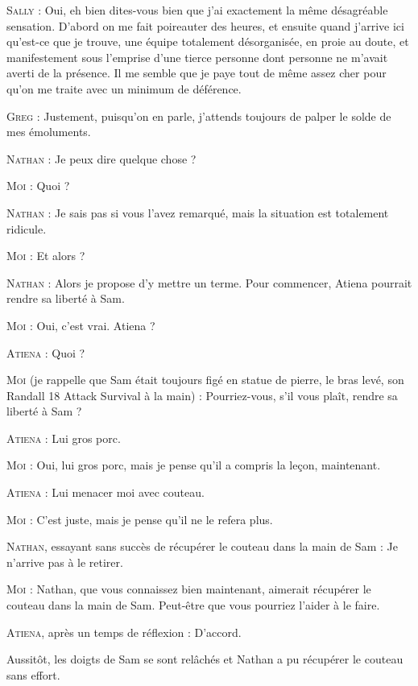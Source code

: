 \begin{dialogue}
\textsc{Sally} : Oui, eh bien dites-vous bien que j’ai exactement la même désagréable sensation. D’abord on me fait poireauter des heures, et ensuite quand j’arrive ici qu’est-ce que je trouve, une équipe totalement désorganisée, en proie au doute, et manifestement sous l’emprise d’une tierce personne dont personne ne m’avait averti de la présence. Il me semble que je paye tout de même assez cher pour qu’on me traite avec un minimum de déférence.

\textsc{Greg} : Justement, puisqu’on en parle, j’attends toujours de palper le solde de mes émoluments.

\textsc{Nathan} : Je peux dire quelque chose ?

\textsc{Moi} : Quoi ?

\textsc{Nathan} : Je sais pas si vous l’avez remarqué, mais la situation est totalement ridicule.

\textsc{Moi} : Et alors ?

\textsc{Nathan} : Alors je propose d’y mettre un terme. Pour commencer, Atiena pourrait rendre sa liberté à Sam.

\textsc{Moi} : Oui, c’est vrai. Atiena ?

\textsc{Atiena} : Quoi ?

\textsc{Moi} (je rappelle que Sam était toujours figé en statue de pierre, le bras levé, son Randall 18 Attack Survival à la main) : Pourriez-vous, s’il vous plaît, rendre sa liberté à Sam ?

\textsc{Atiena} : Lui gros porc.

\textsc{Moi} : Oui, lui gros porc, mais je pense qu’il a compris la leçon, maintenant.

\textsc{Atiena} : Lui menacer moi avec couteau.

\textsc{Moi} : C’est juste, mais je pense qu’il ne le refera plus.

\textsc{Nathan}, essayant sans succès de récupérer le couteau dans la main de Sam : Je n’arrive pas à le retirer.

\textsc{Moi} : Nathan, que vous connaissez bien maintenant, aimerait récupérer le couteau dans la main de Sam. Peut-être que vous pourriez l’aider à le faire.

\textsc{Atiena}, après un temps de réflexion : D’accord.

\end{dialogue}

Aussitôt, les doigts de Sam se sont relâchés et Nathan a pu récupérer le couteau sans effort.

